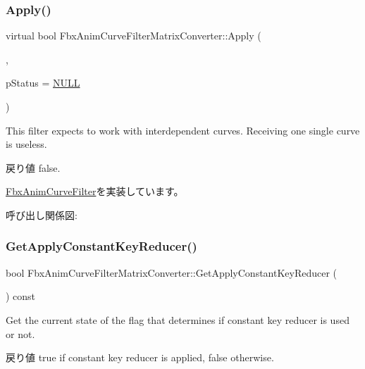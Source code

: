 \subsubsection{\texorpdfstring{Apply()}{Apply()}\hspace{0.1cm}{\footnotesize\ttfamily [7/7]}}
{\footnotesize\ttfamily virtual bool Fbx\+Anim\+Curve\+Filter\+Matrix\+Converter\+::\+Apply (\begin{DoxyParamCaption}\item[{\hyperlink{class_fbx_anim_curve}{Fbx\+Anim\+Curve} \&}]{,  }\item[{\hyperlink{class_fbx_status}{Fbx\+Status} $\ast$}]{p\+Status = {\ttfamily \hyperlink{fbxarch_8h_a070d2ce7b6bb7e5c05602aa8c308d0c4}{N\+U\+LL}} }\end{DoxyParamCaption})\hspace{0.3cm}{\ttfamily [virtual]}}

This filter expects to work with interdependent curves. Receiving one single curve is useless. \begin{DoxyReturn}{戻り値}
{\ttfamily false}. 
\end{DoxyReturn}


\hyperlink{class_fbx_anim_curve_filter_a6a69996c47c0e6f63a0f8b0d5fa806a0}{Fbx\+Anim\+Curve\+Filter}を実装しています。

呼び出し関係図\+:
\mbox{\label{class_fbx_anim_curve_filter_matrix_converter_a01b2d31ebe1cc32373d01c7b3f3e7797}} 
\subsubsection{\texorpdfstring{Get\+Apply\+Constant\+Key\+Reducer()}{GetApplyConstantKeyReducer()}}
{\footnotesize\ttfamily bool Fbx\+Anim\+Curve\+Filter\+Matrix\+Converter\+::\+Get\+Apply\+Constant\+Key\+Reducer (\begin{DoxyParamCaption}{ }\end{DoxyParamCaption}) const}

Get the current state of the flag that determines if constant key reducer is used or not. \begin{DoxyReturn}{戻り値}
{\ttfamily true} if constant key reducer is applied, {\ttfamily false} otherwise. 
\end{DoxyReturn}
\mbox{\label{class_fbx_anim_curve_filter_matrix_converter_acf269bdba7f9526a1c957505cb3beb9c}} 
